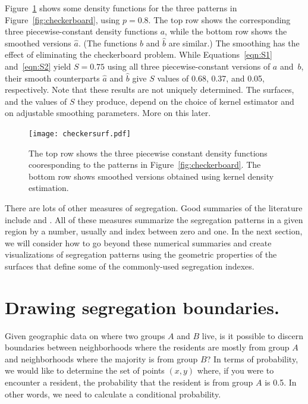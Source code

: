 \documentclass{article}
\theoremstyle{theorem}
\theoremstyle{definition}
\begin{document}
Figure~\ref{fig:kdeexamples} shows some density functions for the three patterns in Figure~\ref{fig:checkerboard}, using $p = 0.8$. The top row shows the corresponding three piecewise-constant density functions $a$, while the bottom row shows the smoothed versions $\hat{a}$. (The functions $b$ and $\hat{b}$ are similar.) The smoothing has the effect of eliminating the checkerboard problem. While Equations~\ref{eqn:S1} and~\ref{eqn:S2} yield $S = 0.75$ using all three piecewise-constant versions of $a$ and~$b$, their smooth counterparts $\hat{a}$ and $\hat{b}$ give $S$ values of 0.68, 0.37, and 0.05, respectively. Note that these results are not uniquely determined. The surfaces, and the values of $S$ they produce, depend on the choice of kernel estimator and on adjustable smoothing parameters. More on this later.

\begin{figure}
  \texttt{[image: checkersurf.pdf]}
  \caption{The top row shows the three piecewise constant density functions cooresponding to the patterns in Figure~\ref{fig:checkerboard}. The bottom row shows smoothed versions obtained using kernel density estimation.}
  \label{fig:kdeexamples}
\end{figure}

There are lots of other measures of segregation. Good summaries of the literature include \cite{reardonosullivan04} and \cite{harrisjohnson18}. All of these measures summarize the segregation patterns in a given region by a number, usually and index between zero and one. In the next section, we will consider how to go beyond these numerical summaries and create visualizations of segregation patterns using the geometric properties of the surfaces that define some of the commonly-used segregation indexes.

\section{Drawing segregation boundaries.}

Given geographic data on where two groups $A$ and $B$ live, is it possible to discern boundaries between neighborhoods where the residents are mostly from group $A$ and neighborhoods where the majority is from group $B$? In terms of probability, we would like to determine the set of points $(x,y)$ where, if you were to encounter a resident, the probability that the resident is from group $A$ is 0.5. In other words, we need to calculate a conditional probability.
\end{document}
